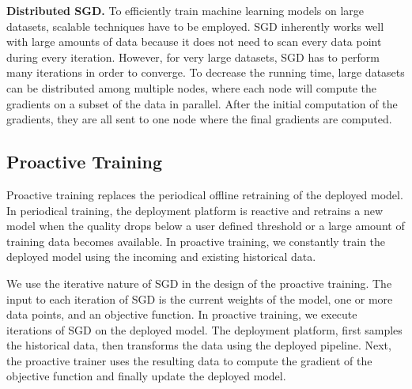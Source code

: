 \textbf{Distributed SGD.}
To efficiently train machine learning models on large datasets, scalable techniques have to be employed.
SGD inherently works well with large amounts of data because it does not need to scan every data point during every iteration.
However, for very large datasets, SGD has to perform many iterations in order to converge.
To decrease the running time, large datasets can be distributed among multiple nodes, where each node will compute the gradients on a subset of the data in parallel.
After the initial computation of the gradients, they are all sent to one node where the final gradients are computed.

\subsection{Proactive Training} \label{proactive-training}
Proactive training replaces the periodical offline retraining of the deployed model.
In periodical training, the deployment platform is reactive and retrains a new model when the quality drops below a user defined threshold or a large amount of training data becomes available.
In proactive training, we constantly train the deployed model using the incoming and existing historical data.

We use the iterative nature of SGD in the design of the proactive training.
The input to each iteration of SGD is the current weights of the model, one or more data points, and an objective function.
In proactive training, we execute iterations of SGD on the deployed model.
The deployment platform, first samples the historical data, then transforms the data using the deployed pipeline.
Next, the proactive trainer uses the resulting data to compute the gradient of the objective function and finally update the deployed model.

